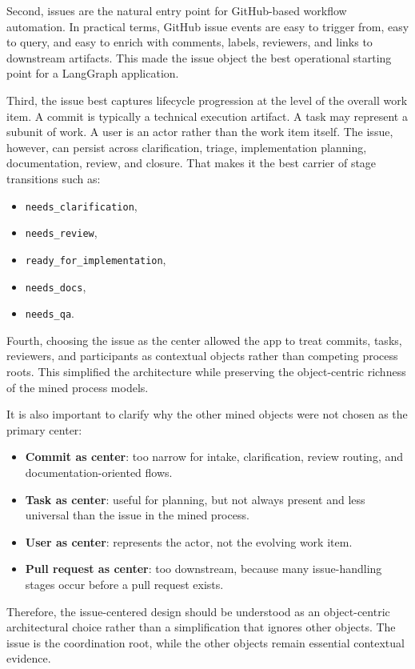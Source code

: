 \documentclass[11pt,a4paper]{article}
\begin{document}
Second, issues are the natural entry point for GitHub-based workflow automation. In practical terms, GitHub issue events are easy to trigger from, easy to query, and easy to enrich with comments, labels, reviewers, and links to downstream artifacts. This made the issue object the best operational starting point for a LangGraph application.

Third, the issue best captures lifecycle progression at the level of the overall work item. A commit is typically a technical execution artifact. A task may represent a subunit of work. A user is an actor rather than the work item itself. The issue, however, can persist across clarification, triage, implementation planning, documentation, review, and closure. That makes it the best carrier of stage transitions such as:
\begin{itemize}
    \item \texttt{needs\_clarification},
    \item \texttt{needs\_review},
    \item \texttt{ready\_for\_implementation},
    \item \texttt{needs\_docs},
    \item \texttt{needs\_qa}.
\end{itemize}

Fourth, choosing the issue as the center allowed the app to treat commits, tasks, reviewers, and participants as contextual objects rather than competing process roots. This simplified the architecture while preserving the object-centric richness of the mined process models.

It is also important to clarify why the other mined objects were not chosen as the primary center:
\begin{itemize}
    \item \textbf{Commit as center}: too narrow for intake, clarification, review routing, and documentation-oriented flows.
    \item \textbf{Task as center}: useful for planning, but not always present and less universal than the issue in the mined process.
    \item \textbf{User as center}: represents the actor, not the evolving work item.
    \item \textbf{Pull request as center}: too downstream, because many issue-handling stages occur before a pull request exists.
\end{itemize}

Therefore, the issue-centered design should be understood as an object-centric architectural choice rather than a simplification that ignores other objects. The issue is the coordination root, while the other objects remain essential contextual evidence.
\end{document}
